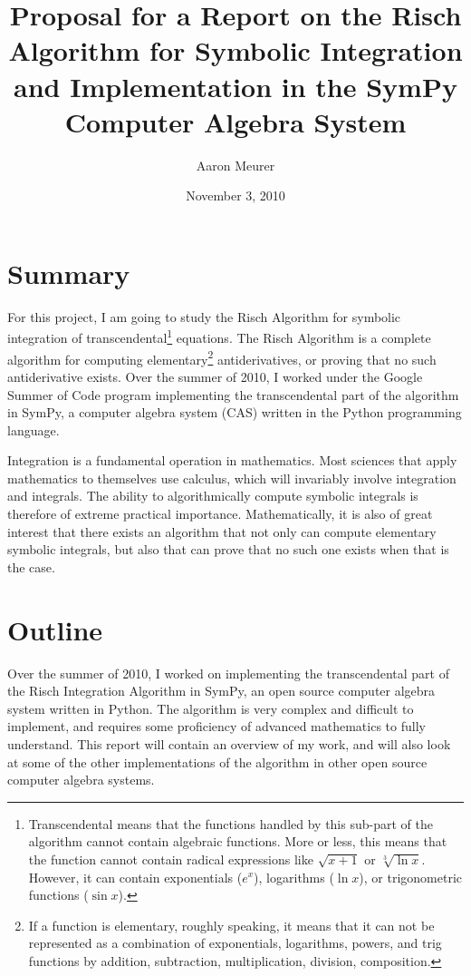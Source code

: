 \documentclass[12pt]{article}
\begin{document}
\title{Proposal for a Report on the Risch Algorithm for Symbolic
Integration and Implementation in the Sym\-Py Computer Algebra System}
\author{Aaron Meurer}
\date{November 3, 2010}
\maketitle
\tableofcontents
\section{Summary}
For this project, I am going to study the Risch Algorithm for symbolic
integration of transcendental\footnote{Transcendental means that the
functions handled by this sub-part of the algorithm cannot contain
algebraic functions. More or less, this means that the function cannot
contain radical expressions like $\sqrt{x + 1}$ or $\sqrt[3]{\ln{x}}$.
However, it can contain exponentials ($e^x$), logarithms ($\ln{x}$), or
trigonometric functions ($\sin{x}$).} equations.  The Risch Algorithm is
a complete algorithm for computing elementary\footnote{If a function is
elementary, roughly speaking, it means that it can not be represented as
a combination of exponentials, logarithms, powers, and trig functions by
addition, subtraction, multiplication, division, composition.}
antiderivatives, or proving that no such antiderivative exists.  Over
the summer of 2010, I worked under the Goo\-gle Summer of Code program
implementing the transcendental part of the algorithm in Sym\-Py, a
computer algebra system (CAS) written in the Py\-thon programming
language.

Integration is a fundamental operation in mathematics.  Most sciences
that apply mathematics to themselves use calculus, which will invariably
involve integration and integrals.  The ability to algorithmically
compute symbolic integrals is therefore of extreme practical importance.
 Mathematically, it is also of great interest that there exists an
algorithm that not only can compute elementary symbolic integrals, but
also that can prove that no such one exists when that is the case.

\section{Outline}
Over the summer of 2010, I worked on implementing the transcendental
part of the Risch Integration Algorithm in Sym\-Py, an open source
computer algebra system written in Python.  The algorithm is very
complex and difficult to implement, and requires some proficiency of
advanced mathematics to fully understand.  This report will contain an
overview of my work, and will also look at some of the other
implementations of the algorithm in other open source computer algebra
systems.
\end{document}
